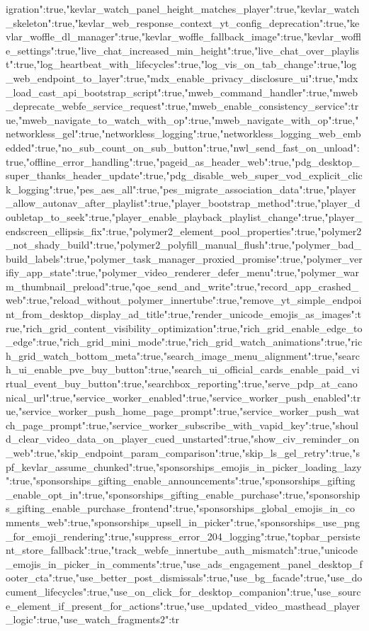 {igration":true,"kevlar_watch_panel_height_matches_player":true,"kevlar_watch_skeleton":true,"kevlar_web_response_context_yt_config_deprecation":true,"kevlar_woffle_dl_manager":true,"kevlar_woffle_fallback_image":true,"kevlar_woffle_settings":true,"live_chat_increased_min_height":true,"live_chat_over_playlist":true,"log_heartbeat_with_lifecycles":true,"log_vis_on_tab_change":true,"log_web_endpoint_to_layer":true,"mdx_enable_privacy_disclosure_ui":true,"mdx_load_cast_api_bootstrap_script":true,"mweb_command_handler":true,"mweb_deprecate_webfe_service_request":true,"mweb_enable_consistency_service":true,"mweb_navigate_to_watch_with_op":true,"mweb_navigate_with_op":true,"networkless_gel":true,"networkless_logging":true,"networkless_logging_web_embedded":true,"no_sub_count_on_sub_button":true,"nwl_send_fast_on_unload":true,"offline_error_handling":true,"pageid_as_header_web":true,"pdg_desktop_super_thanks_header_update":true,"pdg_disable_web_super_vod_explicit_click_logging":true,"pes_aes_all":true,"pes_migrate_association_data":true,"player_allow_autonav_after_playlist":true,"player_bootstrap_method":true,"player_doubletap_to_seek":true,"player_enable_playback_playlist_change":true,"player_endscreen_ellipsis_fix":true,"polymer2_element_pool_properties":true,"polymer2_not_shady_build":true,"polymer2_polyfill_manual_flush":true,"polymer_bad_build_labels":true,"polymer_task_manager_proxied_promise":true,"polymer_verifiy_app_state":true,"polymer_video_renderer_defer_menu":true,"polymer_warm_thumbnail_preload":true,"qoe_send_and_write":true,"record_app_crashed_web":true,"reload_without_polymer_innertube":true,"remove_yt_simple_endpoint_from_desktop_display_ad_title":true,"render_unicode_emojis_as_images":true,"rich_grid_content_visibility_optimization":true,"rich_grid_enable_edge_to_edge":true,"rich_grid_mini_mode":true,"rich_grid_watch_animations":true,"rich_grid_watch_bottom_meta":true,"search_image_menu_alignment":true,"search_ui_enable_pve_buy_button":true,"search_ui_official_cards_enable_paid_virtual_event_buy_button":true,"searchbox_reporting":true,"serve_pdp_at_canonical_url":true,"service_worker_enabled":true,"service_worker_push_enabled":true,"service_worker_push_home_page_prompt":true,"service_worker_push_watch_page_prompt":true,"service_worker_subscribe_with_vapid_key":true,"should_clear_video_data_on_player_cued_unstarted":true,"show_civ_reminder_on_web":true,"skip_endpoint_param_comparison":true,"skip_ls_gel_retry":true,"spf_kevlar_assume_chunked":true,"sponsorships_emojis_in_picker_loading_lazy":true,"sponsorships_gifting_enable_announcements":true,"sponsorships_gifting_enable_opt_in":true,"sponsorships_gifting_enable_purchase":true,"sponsorships_gifting_enable_purchase_frontend":true,"sponsorships_global_emojis_in_comments_web":true,"sponsorships_upsell_in_picker":true,"sponsorships_use_png_for_emoji_rendering":true,"suppress_error_204_logging":true,"topbar_persistent_store_fallback":true,"track_webfe_innertube_auth_mismatch":true,"unicode_emojis_in_picker_in_comments":true,"use_ads_engagement_panel_desktop_footer_cta":true,"use_better_post_dismissals":true,"use_bg_facade":true,"use_document_lifecycles":true,"use_on_click_for_desktop_companion":true,"use_source_element_if_present_for_actions":true,"use_updated_video_masthead_player_logic":true,"use_watch_fragments2":tr}
